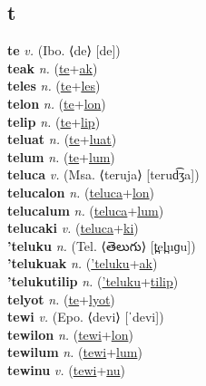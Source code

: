 \subsection{t}

\textbf{te} \textit{v.} (Ibo. ⟨de⟩ [de])
 \label{te} \\
\textbf{teak} \textit{n.} (\hyperref[te]{te}+\hyperref[ak]{ak})
 \label{teak} \\
\textbf{teles} \textit{n.} (\hyperref[te]{te}+\hyperref[les]{les})
 \label{teles} \\
\textbf{telon} \textit{n.} (\hyperref[te]{te}+\hyperref[lon]{lon})
 \label{telon} \\
\textbf{telip} \textit{n.} (\hyperref[te]{te}+\hyperref[lip]{lip})
 \label{telip} \\
\textbf{teluat} \textit{n.} (\hyperref[te]{te}+\hyperref[luat]{luat})
 \label{teluat} \\
\textbf{telum} \textit{n.} (\hyperref[te]{te}+\hyperref[lum]{lum})
 \label{telum} \\
\textbf{teluca} \textit{v.} (Msa. ⟨teruja⟩ [terud͡ʒa])
 \label{teluca} \\
\textbf{telucalon} \textit{n.} (\hyperref[teluca]{teluca}+\hyperref[lon]{lon})
 \label{telucalon} \\
\textbf{telucalum} \textit{n.} (\hyperref[teluca]{teluca}+\hyperref[lum]{lum})
 \label{telucalum} \\
\textbf{telucaki} \textit{v.} (\hyperref[teluca]{teluca}+\hyperref[ki]{ki})
 \label{telucaki} \\
\textbf{'teluku} \textit{n.} (Tel. ⟨తెలుగు⟩ [t̪el̪uɡu])
 \label{'teluku} \\
\textbf{'telukuak} \textit{n.} (\hyperref['teluku]{'teluku}+\hyperref[ak]{ak})
 \label{'telukuak} \\
\textbf{'telukutilip} \textit{n.} (\hyperref['teluku]{'teluku}+\hyperref[tilip]{tilip})
 \label{'telukutilip} \\
\textbf{telyot} \textit{n.} (\hyperref[te]{te}+\hyperref[lyot]{lyot})
 \label{telyot} \\
\textbf{tewi} \textit{v.} (Epo. ⟨devi⟩ [ˈdevi])
 \label{tewi} \\
\textbf{tewilon} \textit{n.} (\hyperref[tewi]{tewi}+\hyperref[lon]{lon})
 \label{tewilon} \\
\textbf{tewilum} \textit{n.} (\hyperref[tewi]{tewi}+\hyperref[lum]{lum})
 \label{tewilum} \\
\textbf{tewinu} \textit{v.} (\hyperref[tewi]{tewi}+\hyperref[nu]{nu})
 \label{tewinu} \\
